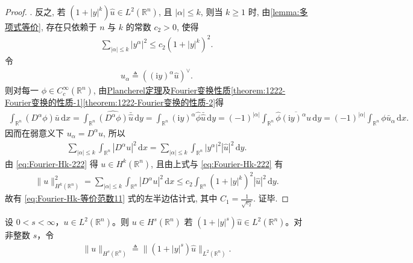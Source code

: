 \documentclass[../../main.tex]{subfiles}
\begin{document}
\begin{proof}
{. } 反之, 若 $(1+|y|^k)\hat{u}\in L^2(\mathbb{R}^n)$, 且 $|\alpha|\leqslant k$, 则当 $k\geqslant 1$ 时, 由\cref{lemma:多项式等价}, 存在只依赖于 $n$ 与 $k$ 的常数 $c_2>0$, 使得
\begin{align}\label{eq:Fourier-Hk-222}
\sum_{|\alpha|\leqslant k}|y^\alpha|^2
\leqslant c_2(1+|y|^k)^2.
\end{align}
令
\begin{align*}
u_\alpha\triangleq ((\text{i}y)^\alpha\hat{u})^\vee.
\end{align*}
则对每一 $\phi\in C_c^\infty(\mathbb{R}^n)$, 由\hyperref[theorem:Plancherel定理]{Plancherel定理}及\hyperref[theorem:1222-Fourier变换的性质]{Fourier变换性质\ref{theorem:1222-Fourier变换的性质-1}\ref{theorem:1222-Fourier变换的性质-2}}得
\begin{align*}
\int_{\mathbb{R}^n}(D^\alpha\phi)\bar{u}\,\mathrm{d}x
=\int_{\mathbb{R}^n}\widehat{(D^\alpha\phi)}\bar{\hat{u}}\,\mathrm{d}y
=\int_{\mathbb{R}^n}(\text{i}y)^\alpha\hat{\phi}\bar{\hat{u}}\,\mathrm{d}y =(-1)^{|\alpha|}\int_{\mathbb{R}^n}\hat{\phi}\overline{(\text{i}y)^\alpha\hat{u}}\,\mathrm{d}y
=(-1)^{|\alpha|}\int_{\mathbb{R}^n}\phi\bar{u}_\alpha\,\mathrm{d}x.
\end{align*}
因而在弱意义下 $u_\alpha=D^\alpha u$, 所以
\begin{align*}
\sum_{|\alpha|\leqslant k}\int_{\mathbb{R}^n}|D^\alpha u|^2\,\mathrm{d}x
=\sum_{|\alpha|\leqslant k}\int_{\mathbb{R}^n}|y^\alpha|^2|\hat{u}|^2\,\mathrm{d}y.
\end{align*}
由 \eqref{eq:Fourier-Hk-222} 得 $u\in H^k(\mathbb{R}^n)$, 且由上式与 \eqref{eq:Fourier-Hk-222} 有
\begin{align*}
\|u\|_{H^k(\mathbb{R}^n)}^2
=\sum_{|\alpha|\leqslant k}\int_{\mathbb{R}^n}|D^\alpha u|^2\,\mathrm{d}x
\leqslant c_2\int_{\mathbb{R}^n}(1+|y|^k)^2|\hat{u}|^2\,\mathrm{d}y.
\end{align*}
故有 \eqref{eq:Fourier-Hk-等价范数11} 式的左半边估计式, 其中 $C_1=\frac{1}{\sqrt{c_2}}$. 证毕.
\end{proof}

\begin{definition}\label{definition:ch05-Hs}
设 $0<s<\infty$，$u\in L^{2}(\mathbb{R}^{n})$。则 $u\in H^{s}(\mathbb{R}^{n})$ 若 $(1+|y|^{s})\widehat{u}\in L^{2}(\mathbb{R}^{n})$。对非整数 $s$，令
\begin{align*}
\|u\|_{H^{s}(\mathbb{R}^{n})}\triangleq\|(1+|y|^{s})\widehat{u}\|_{L^{2}(\mathbb{R}^{n})}.
\end{align*}
\end{definition}
\end{document}
